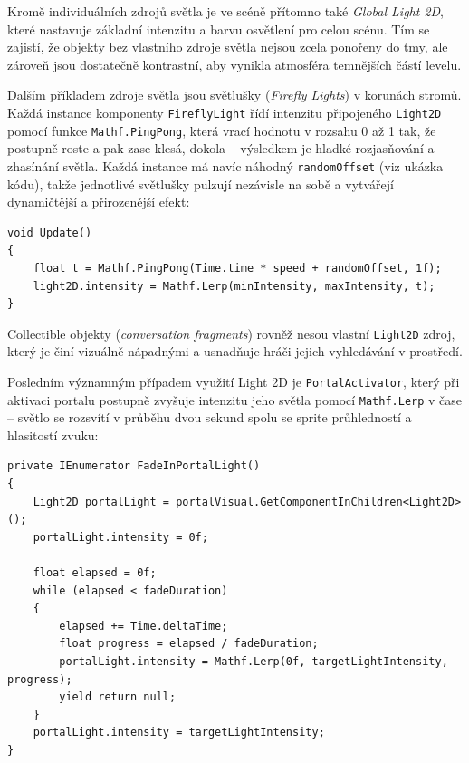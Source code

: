 Kromě individuálních zdrojů světla je ve scéně přítomno také \emph{Global Light 2D}, které nastavuje základní intenzitu a barvu osvětlení pro celou scénu. Tím se zajistí, že objekty bez vlastního zdroje světla nejsou zcela ponořeny do tmy, ale zároveň jsou dostatečně kontrastní, aby vynikla atmosféra temnějších částí levelu.

Dalším příkladem zdroje světla jsou světlušky (\emph{Firefly Lights}) v korunách stromů. Každá instance komponenty \texttt{FireflyLight} řídí intenzitu připojeného \texttt{Light2D} pomocí funkce \texttt{Mathf.PingPong}, která vrací hodnotu v rozsahu 0 až 1 tak, že postupně roste a pak zase klesá, dokola -- výsledkem je hladké rozjasňování a zhasínání světla. Každá instance má navíc náhodný \texttt{randomOffset} (viz ukázka kódu), takže jednotlivé světlušky pulzují nezávisle na sobě a vytvářejí dynamičtější a přirozenější efekt:

\begin{lstlisting}[caption={FireflyLight -- pulzující světlo}, label={lst:firefly-light}]
void Update()
{
    float t = Mathf.PingPong(Time.time * speed + randomOffset, 1f);
    light2D.intensity = Mathf.Lerp(minIntensity, maxIntensity, t);
}
\end{lstlisting}

Collectible objekty (\emph{conversation fragments}) rovněž nesou vlastní \texttt{Light2D} zdroj, který je činí vizuálně nápadnými a usnadňuje hráči jejich vyhledávání v prostředí.

Posledním významným případem využití Light 2D je \texttt{PortalActivator}, který při aktivaci portalu postupně zvyšuje intenzitu jeho světla pomocí \texttt{Mathf.Lerp} v čase -- světlo se rozsvítí v průběhu dvou sekund spolu se sprite průhledností a hlasitostí zvuku:

\newpage

\begin{lstlisting}[caption={PortalActivator -- fade in portalu}, label={lst:portal-light}]
private IEnumerator FadeInPortalLight()
{
    Light2D portalLight = portalVisual.GetComponentInChildren<Light2D>();
    portalLight.intensity = 0f;

    float elapsed = 0f;
    while (elapsed < fadeDuration)
    {
        elapsed += Time.deltaTime;
        float progress = elapsed / fadeDuration;
        portalLight.intensity = Mathf.Lerp(0f, targetLightIntensity, progress);
        yield return null;
    }
    portalLight.intensity = targetLightIntensity;
}
\end{lstlisting}

